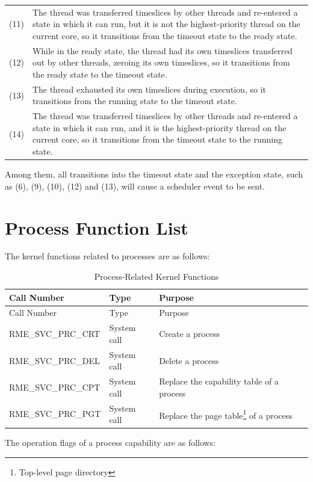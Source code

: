 \begin{xltabular}{\textwidth}{@{}>{\hsize\raggedright\arraybackslash}X>{\hsize\raggedright\arraybackslash}X@{}}
    (11) & The thread was transferred timeslices by other threads and re-entered a state in which it can run, but it is not the highest-priority thread on the current core, so it transitions from the timeout state to the ready state.\tabularnewline
    (12) & While in the ready state, the thread had its own timeslices transferred out by other threads, zeroing its own timeslices, so it transitions from the ready state to the timeout state.\tabularnewline
    (13) & The thread exhausted its own timeslices during execution, so it transitions from the running state to the timeout state.\tabularnewline
    (14) & The thread was transferred timeslices by other threads and re-entered a state in which it can run, and it is the highest-priority thread on the current core, so it transitions from the timeout state to the running state.\tabularnewline
\end{xltabular}
\nopagebreak[4]

Among them, all transitions into the timeout state and the exception state, such as (6), (9), (10), (12) and (13), will cause a scheduler event to be sent.

\section{Process Function List}\label{sec:4-process-function-list}

The kernel functions related to processes are as follows:

\begin{xltabular}{\textwidth}{@{}>{\hsize\raggedright\arraybackslash}X>{\hsize\raggedright\arraybackslash}X>{\hsize\raggedright\arraybackslash}X@{}}
\caption{Process-Related Kernel Functions}\label{tab:4-8-process-related-kernel-functions}\\
\toprule
Call Number & Type & Purpose\tabularnewline
\endfirsthead
\toprule
Call Number & Type & Purpose\tabularnewline
\midrule
\endhead
\bottomrule
\endlastfoot
RME\_SVC\_PRC\_CRT & System call & Create a process\tabularnewline
RME\_SVC\_PRC\_DEL & System call & Delete a process\tabularnewline
RME\_SVC\_PRC\_CPT & System call & Replace the capability table of a process\tabularnewline
RME\_SVC\_PRC\_PGT & System call &
Replace the page table\footnote{Top-level page directory} of a process\tabularnewline
\end{xltabular}
\nopagebreak[4]

The operation flags of a process capability are as follows:

